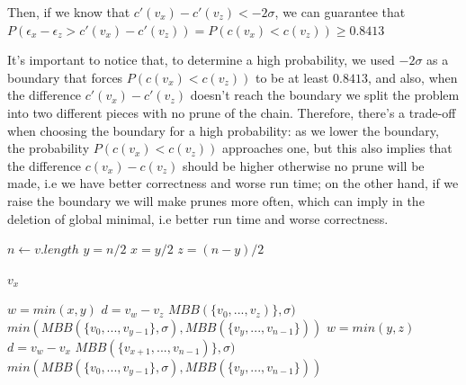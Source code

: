 \documentclass[12pt]{article}
\begin{document}
Then, if we know that $c' (v_x) - c' (v_z) < -2\sigma$, we can guarantee that $P (\epsilon_x - \epsilon_z > c'(v_x) - c' (v_z)) = P (c (v_x) < c (v_z)) \geq 0.8413$

It's important to notice that, to determine a high probability, we used $-2\sigma$ as a boundary that forces $P (c (v_x) < c (v_z))$ to be at least $0.8413$, and also, when the difference $c'(v_x) - c'(v_z)$ doesn't reach the boundary we split the problem into two different pieces with no prune of the chain. Therefore, there's a trade-off when choosing the boundary for a high probability: as we lower the boundary, the probability $P (c (v_x) < c (v_z))$ approaches one, but this also implies that the difference $c (v_x) - c (v_z)$ should be higher otherwise no prune will be made, i.e we have better correctness and worse run time; on the other hand, if we raise the boundary we will make prunes more often, which can imply in the deletion of global minimal, i.e better run time and worse correctness.

\begin{algorithm}[h]
\caption{}
\begin{algorithmic}[1]
    \State $n \gets v.length$
    \State $y = n / 2$
    \State $x = y / 2$
    \State $z = (n - y) / 2$

        \State
        \Return $v_x$
    \EndIf

        \State $w = min (x, y)$
        \State $d = v_w - v_z$
            \State
            \Return $MBB (\{v_0, ..., v_z)\}, \sigma)$
        \Else
            \State
            \Return $min (MBB (\{v_0, ..., v_{y-1}\}, \sigma), MBB (\{v_y, ..., v_{n-1}\}))$
        \EndIf
    \Else
        \State $w = min (y, z)$
        \State $d = v_w - v_x$
            \State
            \Return $MBB (\{v_{x + 1}, ..., v_{n - 1})\}, \sigma)$
        \Else
            \State
            \Return $min (MBB (\{v_0, ..., v_{y-1}\}, \sigma), MBB (\{v_y, ..., v_{n-1}\}))$
        \EndIf
    \EndIf
\EndProcedure
\end{algorithmic}
\end{algorithm}
\end{document}
